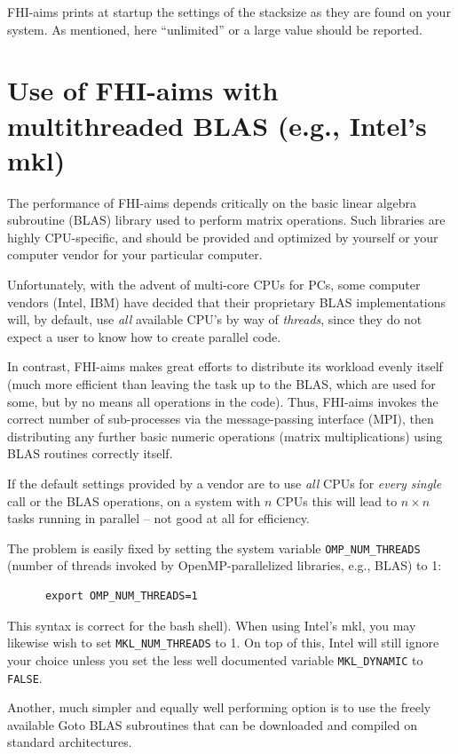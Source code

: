 FHI-aims prints at startup the settings of the stacksize as they are
found on your system. As mentioned, here ``unlimited'' or a large
value should be reported.


\section{Use of FHI-aims with multithreaded BLAS (e.g., Intel's mkl)}

The performance of FHI-aims depends critically on the basic linear
algebra subroutine (BLAS) library used to perform matrix
operations. Such libraries are highly CPU-specific, and should be
provided and optimized by yourself or your computer vendor for your
particular computer.

Unfortunately, with the advent of multi-core CPUs for PCs, some
computer vendors (Intel, IBM) have decided that their proprietary BLAS
implementations will, by default, use \emph{all} available CPU's by
way of \emph{threads}, since they do not expect a user to know how to
create parallel code.

In contrast, FHI-aims makes great efforts to distribute its workload
evenly itself (much more efficient than leaving the task up to the
BLAS, which are used for some, but by no means all operations in the
code). Thus, FHI-aims invokes the correct number of sub-processes via
the message-passing interface (MPI), then distributing any further
basic numeric operations (matrix multiplications) using BLAS routines
correctly itself. 

If the default settings provided by a vendor are to use \emph{all}
CPUs for \emph{every single} call or the BLAS operations, on a system
with $n$ CPUs this will lead to $n\times n$ tasks running in parallel
-- not good at all for efficiency.

The problem is easily fixed by setting the system variable
\texttt{OMP\_NUM\_THREADS} (number of threads invoked by OpenMP-parallelized
libraries, e.g., BLAS) to 1:
    \begin{verbatim}
      export OMP_NUM_THREADS=1
    \end{verbatim}
This syntax is correct for the bash shell). When using Intel's mkl, you
may likewise wish to set \texttt{MKL\_NUM\_THREADS} to 1. On top of
this, Intel will still ignore your choice unless you set the less well
documented variable \texttt{MKL\_DYNAMIC} to \texttt{FALSE}.

Another, much simpler and equally well performing option is to use the
freely available Goto BLAS subroutines that can be downloaded and
compiled on standard architectures. 

